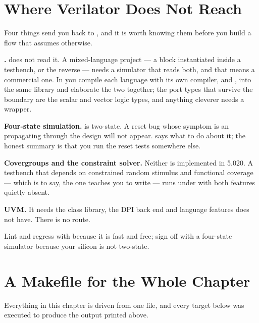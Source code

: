 \section{Where Verilator Does Not Reach}
\label{sec:verilator:limits}

Four things send you back to , and it is worth knowing them
before you build a flow that assumes otherwise.

\textbf{\VHDL{}.}  does not read it. A mixed-language
project --- a \VHDL{} block instantiated inside a \SV{} testbench, or the
reverse --- needs a simulator that reads both, and that means a commercial
one. In  you compile each language with its own compiler,
 and , into the same library and elaborate the
two together; the port types that survive the boundary are the scalar and
vector logic types, and anything cleverer needs a wrapper.

\textbf{Four-state simulation.}  is two-state. A reset bug
whose symptom is an  propagating through the design will not appear.
 says what to do about it; the honest summary is
that you run the reset tests somewhere else.

\textbf{Covergroups and the constraint solver.} Neither is implemented in
5.020. A testbench that depends on constrained random stimulus and functional
coverage --- which is to say, the one  teaches you to write ---
runs under  with both features quietly absent.

\textbf{UVM.} It needs the class library, the DPI back end and language
features  does not have. There is no route.

\begin{ruleofthumb}
Lint and regress with  because it is fast and free; sign off
with a four-state simulator because your silicon is not two-state.
\end{ruleofthumb}


\section{A Makefile for the Whole Chapter}
\label{sec:verilator:make}

Everything in this chapter is driven from one file, and every target below was
executed to produce the output printed above.

